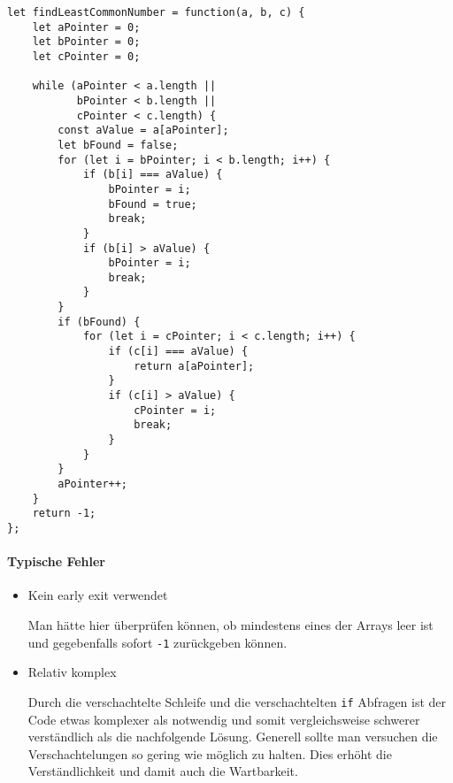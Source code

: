 \documentclass[babel]{book}
\begin{document}
\begin{lstlisting}[caption=My Javascript Example]
let findLeastCommonNumber = function(a, b, c) {
	let aPointer = 0;
	let bPointer = 0;
	let cPointer = 0;
	
	while (aPointer < a.length ||
		   bPointer < b.length || 
		   cPointer < c.length) {
		const aValue = a[aPointer];
		let bFound = false;
		for (let i = bPointer; i < b.length; i++) {
			if (b[i] === aValue) {
				bPointer = i;
				bFound = true;
				break;
			}
			if (b[i] > aValue) {
				bPointer = i;
				break;
			}
		}
		if (bFound) {
			for (let i = cPointer; i < c.length; i++) {
				if (c[i] === aValue) {
					return a[aPointer];
				}
				if (c[i] > aValue) {
					cPointer = i;
					break;
				}
			}
		}
		aPointer++;
	}
	return -1;
};
\end{lstlisting}

\paragraph{Typische Fehler}
\begin{itemize} 
	\item Kein early exit verwendet
	
	Man hätte hier überprüfen können, ob mindestens eines der Arrays leer ist und gegebenfalls sofort \lstinline|-1| zurückgeben können.
	
	\item Relativ komplex
	
	Durch die verschachtelte Schleife und die verschachtelten \lstinline|if| Abfragen ist der Code etwas komplexer als notwendig und somit vergleichsweise schwerer verständlich als die nachfolgende Lösung. Generell sollte man versuchen die Verschachtelungen so gering wie möglich zu halten. Dies erhöht die Verständlichkeit und damit auch die Wartbarkeit.
	
\end{itemize}
\end{document}
